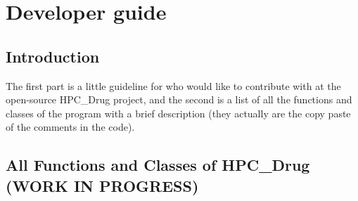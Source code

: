 

\chapter{Developer guide}

	\section{Introduction}
		The first part is a little guideline for who would like to contribute with at the open-source HPC\_Drug project, and the second is a list of all the functions and classes of the program with a brief description (they actually are the copy paste of the comments in the code).
		
	
		
	\section{All Functions and Classes of HPC\_Drug  (WORK IN PROGRESS)}

	    
	        
	    
	        
	    
	
	    
	
